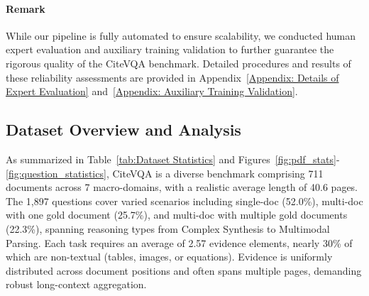 \documentclass{llmxive}
\begin{document}
{\paragraph{Remark} While our pipeline is fully automated to ensure scalability, we conducted human expert evaluation and auxiliary training validation to further guarantee the rigorous quality of the CiteVQA benchmark. Detailed procedures and results of these reliability assessments are provided in Appendix~\ref{Appendix: Details of Expert Evaluation} and~\ref{Appendix: Auxiliary Training Validation}.

\subsection{Dataset Overview and Analysis}
As summarized in Table~\ref{tab:Dataset Statistics} and Figures~\ref{fig:pdf_stats}-\ref{fig:question_statistics}, CiteVQA is a diverse benchmark comprising 711 documents across 7 macro-domains, with a realistic average length of 40.6 pages. The 1,897 questions cover varied scenarios including single-doc (52.0\%), multi-doc with one gold document (25.7\%), and multi-doc with multiple gold documents (22.3\%), spanning reasoning types from Complex Synthesis to Multimodal Parsing. Each task requires an average of 2.57 evidence elements, nearly 30\% of which are non-textual (tables, images, or equations). Evidence is uniformly distributed across document positions and often spans multiple pages, demanding robust long-context aggregation.

}
\end{document}
